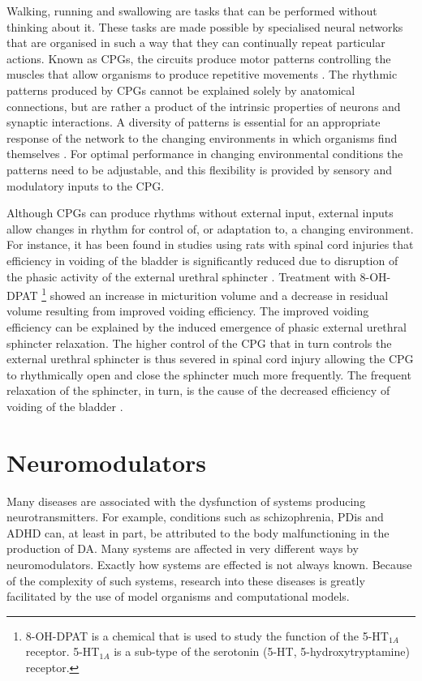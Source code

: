 Walking, running and swallowing are tasks that can be performed without thinking about it. These tasks are made possible by specialised neural networks that are organised in such a way that they can continually repeat particular actions. Known as \acp{CPG}, the circuits produce motor patterns controlling the muscles that allow organisms to produce repetitive movements \cite{Duysens1998, Frigon2011, Marder2005}. The rhythmic patterns produced by \acp{CPG} cannot be explained solely by anatomical connections, but are rather a product of the intrinsic properties \cite{Calabrese1998} of neurons and synaptic interactions. A diversity of patterns is essential for an appropriate response of the network to the changing environments in which organisms find themselves \cite{Selverston1998, Abbott1991}. For optimal performance in changing environmental conditions the patterns need to be adjustable, and this flexibility is provided by sensory and modulatory inputs to the \ac{CPG}.

Although \acp{CPG} can produce rhythms without external input, external inputs allow changes in rhythm for control of, or adaptation to, a changing environment. For instance, it has been found in studies using rats with spinal cord injuries that efficiency in voiding of the bladder is significantly reduced due to disruption of the phasic activity of the external urethral sphincter \cite{Dolber2007}. Treatment with 8-OH-DPAT \footnote{8-OH-DPAT is a chemical that is used to study the function of the 5-HT$_{1A}$ receptor. 5-HT$_{1A}$ is a sub-type of the serotonin (5-HT, 5-hydroxytryptamine) receptor.}  showed an increase in micturition volume and a decrease in residual volume resulting from improved voiding efficiency. The improved voiding efficiency can be explained by the induced emergence of phasic external urethral sphincter relaxation. The higher control of the \ac{CPG} that in turn controls the external urethral sphincter is thus severed in spinal cord injury allowing the \ac{CPG} to rhythmically open and close the sphincter much more frequently. The frequent relaxation of the sphincter, in turn, is the cause of the decreased efficiency of voiding of the bladder \cite{Dolber2007}. 


\section{Neuromodulators}
Many diseases are associated with the dysfunction of systems producing neurotransmitters. For example, conditions such as schizophrenia, \ac{PDis} and \ac{ADHD} can, at least in part, be attributed to the body malfunctioning in the production of \ac{DA}. Many systems are affected in very different ways by neuromodulators. Exactly how systems are effected is not always known. Because of the complexity of such systems, research into these diseases is greatly facilitated by the use of model organisms and computational models.

